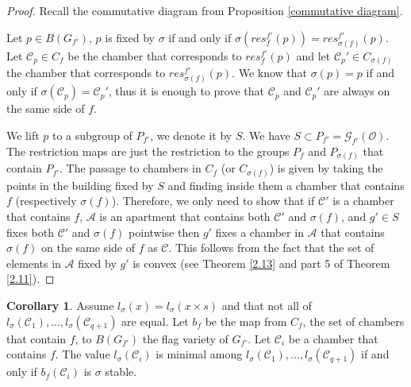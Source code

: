 \documentclass[12pt]{article}
\newcommand{\A}{\mathcal{A}}
\newcommand{\C}{\mathcal{C}}
\newcommand{\s}{\mathcal{O}}
\newcommand{\<}{\langle}
\renewcommand{\>}{\rangle}
\theoremstyle{plain}
\theoremstyle{definition}
\newtheorem{cor}[theorem]{Corollary}
\begin{document}
\begin{proof}
    Recall the commutative diagram from Proposition \ref{commutative diagram}.

\begin{center}   
    
\end{center}

    
    
    
    
    Let $p\in B(G_{f'})$, $p$ is fixed by $\sigma$ if and only if $\sigma(res^{f'}_f(p))=res^{f'}_{\sigma(f)}(p)$. Let $\C_p\in C_f$ be the chamber that corresponds to $res^{f'}_f(p)$ and let $\C_p'\in C_{\sigma(f)}$ the chamber that corresponds to $res^{f'}_{\sigma(f)}(p)$. We know that $\sigma(p)=p$ if and only if $\sigma(\C_p)=\C_p'$, thus it is enough to prove that $\C_p$ and $\C_p'$ are always on the same side of $f$. 
    
    We lift $p$ to a subgroup of $P_{f'}$, we denote it by $S$. We have $S\subset P_{f'}={\mathcal G}_{f'}(\s)$. The restriction maps are just the restriction to the groups $P_f$ and $P_{\sigma(f)}$ that contain $P_{f'}$. The passage to chambers in $C_f$ (or $C_{\sigma(f)}$) is given by taking the points in the building fixed by $S$ and finding inside them a chamber that contains $f$ (respectively $\sigma(f)$). Therefore, we only need to show that if $\C'$ is a chamber that contains $f$, $\A$ is an apartment that contains both $\C'$ and $\sigma(f)$, and $g'\in S$ fixes both $\C'$ and $\sigma(f)$ pointwise then $g'$ fixes a chamber in $\A$ that contains $\sigma(f)$ on the same side of $f$ as $\C$. This follows from the fact that the set of elements in $\A$ fixed by $g'$ is convex (see Theorem \ref{2.13} and part 5 of  Theorem \ref{2.11}). 
\end{proof}

\begin{cor}\label{3.24}
Assume $l_\sigma(x)=l_\sigma(x\times s)$ and that not all of $l_\sigma(\C_1),...,l_\sigma(\C_{q+1})$ are equal. Let $b_f$ be the map from $C_f$, the set of chambers that contain $f$, to $B(G_{f'})$ the flag variety of $G_{f'}$. Let $\C_i$ be a chamber that contains $f$. The value $l_\sigma(\C_i)$ is minimal among $l_\sigma(\C_1),...,l_\sigma(\C_{q+1})$ if and only if $b_f(\C_i)$ is $\sigma$ stable.
\end{cor}
\end{document}

